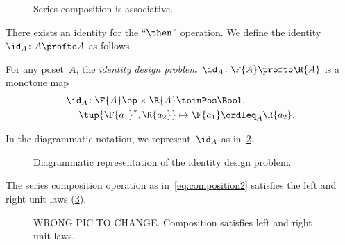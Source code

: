 \begin{figure}[h!]
  \begin{center}
  \end{center}
  \caption{Series composition is associative. \label{fig:compositionassociativity}}
\end{figure}

There exists an identity for the ``$\then$'' operation.
We define the identity~$\id_A\colon A \profto A$ as follows.

\begin{definition}
  \label{def:dp-identity}
  For any poset~$A$, the \emph{identity design problem}~$\id_A\colon \F{A} \profto \R{A}$ is a monotone map
  \begin{equation}
    \begin{aligned}
      \id_A \colon \F{A}\op \times \R{A} & \toinPos   \Bool, \label{eq:identity}\\
      \tup{\F{a_1}^*, \R{a_2}} & \mapsto \F{a_1} \ordleq_{A} \R{a_2}.
    \end{aligned}
  \end{equation}
\end{definition}
In the diagrammatic notation, we represent~$\id_A$ as in~\cref{fig:identitydp}.

\begin{figure}[h!]
  \begin{center}
  \end{center}
  \caption{Diagrammatic representation of the identity design problem. \label{fig:identitydp}}
\end{figure}

\begin{lemma}
  The series composition operation as in~\cref{eq:composition2} satisfies the left and right unit laws (\cref{fig:compositionunital}).
  \begin{figure}[h!]
    \begin{center}
    \end{center}
    \caption{WRONG PIC TO CHANGE. Composition satisfies left and right unit laws. \label{fig:compositionunital}}
  \end{figure}
\end{lemma}

